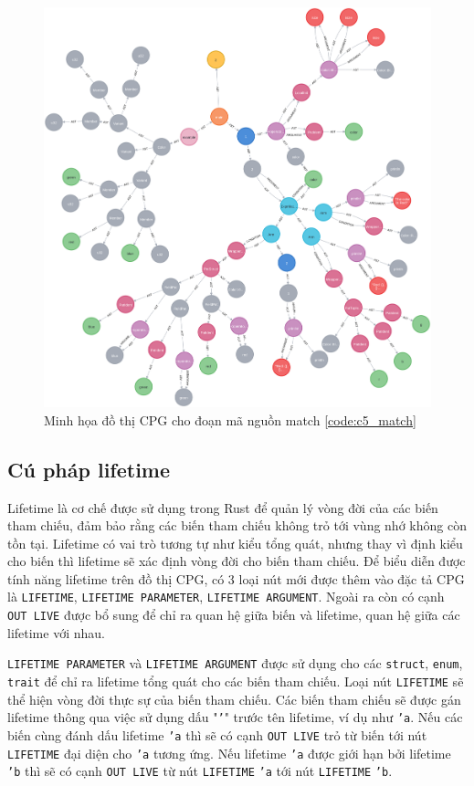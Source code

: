 \begin{figure}[H]
    \includegraphics[width=1\columnwidth]{figures/c5/c5_match.png}
    \centering
    \caption{Minh họa đồ thị CPG cho đoạn mã nguồn match \ref{code:c5_match}}
    \label{img:c5_match}
\end{figure}

\subsection{Cú pháp lifetime}

Lifetime là cơ chế được sử dụng trong Rust để quản lý vòng đời của các biến tham chiếu, đảm bảo rằng các biến tham chiếu không trỏ tới vùng nhớ không còn tồn tại.
Lifetime có vai trò tương tự như kiểu tổng quát, nhưng thay vì định kiểu cho biến thì lifetime sẽ xác định vòng đời cho biến tham chiếu.
Để biểu diễn được tính năng lifetime trên đồ thị CPG, có 3 loại nút mới được thêm vào đặc tả CPG là \texttt{LIFETIME}, \texttt{LIFETIME PARAMETER}, \texttt{LIFETIME ARGUMENT}.
Ngoài ra còn có cạnh \texttt{OUT LIVE} được bổ sung để chỉ ra quan hệ giữa biến và lifetime, quan hệ giữa các lifetime với nhau.

\texttt{LIFETIME PARAMETER} và \texttt{LIFETIME ARGUMENT} được sử dụng cho các \texttt{struct}, \texttt{enum}, \texttt{trait} để chỉ ra lifetime tổng quát cho các biến tham chiếu.
Loại nút \texttt{LIFETIME} sẽ thể hiện vòng đời thực sự của biến tham chiếu.
Các biến tham chiếu sẽ được gán lifetime thông qua việc sử dụng dấu "\texttt{'}" trước tên lifetime, ví dụ như \texttt{'a}.
Nếu các biến cùng đánh dấu lifetime \texttt{'a} thì sẽ có cạnh \texttt{OUT LIVE} trỏ từ biến tới nút \texttt{LIFETIME} đại diện cho \texttt{'a} tương ứng.
Nếu lifetime \texttt{'a} được giới hạn bởi lifetime \texttt{'b} thì sẽ có cạnh \texttt{OUT LIVE} từ nút \texttt{LIFETIME} \texttt{'a} tới nút \texttt{LIFETIME} \texttt{'b}.

